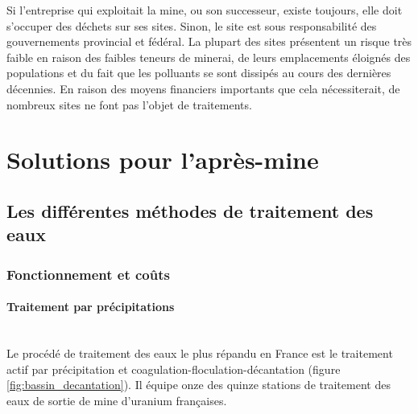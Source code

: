 \documentclass{article}
\begin{document}
Si l'entreprise qui exploitait la mine, ou son successeur, existe toujours, elle doit s'occuper des déchets sur ses sites. Sinon, le site est sous responsabilité des gouvernements provincial et fédéral.
La plupart des sites présentent un risque très faible en raison des faibles teneurs de minerai, de leurs emplacements éloignés des populations et du fait que les polluants se sont dissipés au cours des dernières décennies.
En raison des moyens financiers importants que cela nécessiterait, de nombreux sites ne font pas l'objet de traitements.


\section{Solutions pour l'après-mine}
\subsection{Les différentes méthodes de traitement des eaux}
\subsubsection{Fonctionnement et coûts}

\paragraph{Traitement par précipitations \\ \\}
Le procédé de traitement des eaux le plus répandu en France est le traitement actif par précipitation et coagulation-floculation-décantation (figure \ref{fig:bassin_decantation}). Il équipe onze des quinze stations de traitement des eaux de sortie de mine d'uranium françaises.
\end{document}
